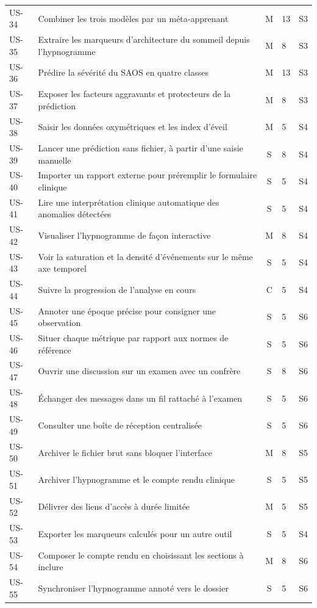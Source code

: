 \begin{longtable}{@{}p{1.25cm}L{9.1cm}cp{0.75cm}p{0.9cm}@{}}
US-34 & Combiner les trois modèles par un méta-apprenant & M & 13 & S3 \\
US-35 & Extraire les marqueurs d'architecture du sommeil depuis l'hypnogramme
& M & 8 & S3 \\
US-36 & Prédire la sévérité du SAOS en quatre classes & M & 13 & S3 \\
US-37 & Exposer les facteurs aggravants et protecteurs de la prédiction & M & 8 & S3 \\
US-38 & Saisir les données oxymétriques et les index d'éveil & M & 5 & S4 \\
US-39 & Lancer une prédiction sans fichier, à partir d'une saisie manuelle & S & 8 & S4 \\
US-40 & Importer un rapport externe pour préremplir le formulaire clinique
& S & 5 & S4 \\
US-41 & Lire une interprétation clinique automatique des anomalies détectées
& S & 5 & S4 \\

US-42 & Visualiser l'hypnogramme de façon interactive & M & 8 & S4 \\
US-43 & Voir la saturation et la densité d'événements sur le même axe temporel
& S & 5 & S4 \\
US-44 & Suivre la progression de l'analyse en cours & C & 5 & S4 \\
US-45 & Annoter une époque précise pour consigner une observation & S & 5 & S6 \\
US-46 & Situer chaque métrique par rapport aux normes de référence & S & 5 & S6 \\

US-47 & Ouvrir une discussion sur un examen avec un confrère & S & 8 & S6 \\
US-48 & Échanger des messages dans un fil rattaché à l'examen & S & 5 & S6 \\
US-49 & Consulter une boîte de réception centralisée & S & 5 & S6 \\

US-50 & Archiver le fichier brut sans bloquer l'interface & M & 8 & S5 \\
US-51 & Archiver l'hypnogramme et le compte rendu clinique & S & 5 & S5 \\
US-52 & Délivrer des liens d'accès à durée limitée & M & 5 & S5 \\
US-53 & Exporter les marqueurs calculés pour un autre outil & S & 5 & S4 \\
US-54 & Composer le compte rendu en choisissant les sections à inclure & M & 8 & S6 \\
US-55 & Synchroniser l'hypnogramme annoté vers le dossier & S & 5 & S6 \\


\end{longtable}
